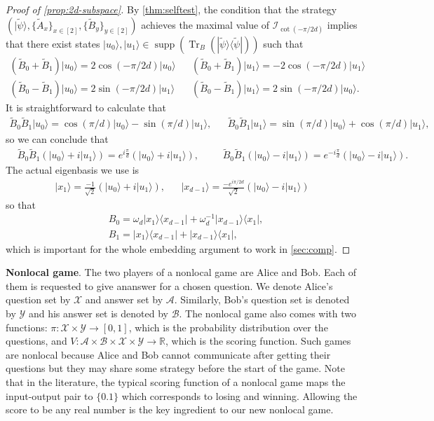 \documentclass[11pt,letterpaper]{article}
\newcommand{\ket}[1]{|#1\rangle}
\newcommand{\ketbra}[2]{|#1\rangle\langle#2|}
\DeclareMathOperator{\Tr}{Tr}
\DeclareMathOperator{\supp}{supp}
\newcommand{\R}{\mathbb{R}}
\newcommand{\calX}{\mathcal{X}}
\newcommand{\calY}{\mathcal{Y}}
\newcommand{\calA}{\mathcal{A}}
\newcommand{\calB}{\mathcal{B}}
\newcommand{\1}{\mathbb{1}}
\newcommand{\tpsi}{\tilde{\psi}}
\newcommand{\I}{\mathcal{I}}
\theoremstyle{definition}
\begin{document}
\begin{proof}[Proof of \cref{prop:2d-subspace}]
	By \cref{thm:selftest}, the condition that the strategy $(\ket{\tpsi}, \{\tilde{A}_x\}_{x \in [2]}, \{\tilde{B}_y\}_{y \in [2]})$ achieves the  
	maximal value of $\I_{\cot(-\pi/2d)} $ implies that there exist states $\ket{u_0}, \ket{u_1} \in \supp(\Tr_B(\ketbra{\tpsi}{\tpsi}))$ such that 
	\begin{align*}
	(\tilde{B}_0 + \tilde{B}_1) \ket{u_0} = 2\cos(-\pi/2d) \ket{u_0} 
	&&(\tilde{B}_0 + \tilde{B}_1) \ket{u_1} = -2\cos(-\pi/2d) \ket{u_1}\\
	(\tilde{B}_0 - \tilde{B}_1) \ket{u_0} = 2\sin(-\pi/2d) \ket{u_1} 
	&&(\tilde{B}_0 - \tilde{B}_1) \ket{u_1} = 2\sin(-\pi/2d) \ket{u_0}.
	\end{align*}
	It is straightforward to calculate that 
	\begin{align*}
		\tilde{B}_0\tilde{B}_1 \ket{u_0} = \cos(\pi/d) \ket{u_0} -\sin(\pi/d) \ket{u_1},&&
		\tilde{B}_0\tilde{B}_1\ket{u_1} = \sin(\pi/d)\ket{u_0} + \cos(\pi/d) \ket{u_1},
	\end{align*}
	so we can conclude that 
	\begin{align*}
		&\tilde{B}_0\tilde{B}_1(\ket{u_0} + i\ket{u_1}) = e^{i \frac{\pi}{d}} (\ket{u_0} + i\ket{u_1}), &&
		&\tilde{B}_0\tilde{B}_1(\ket{u_0} - i\ket{u_1}) = e^{-i \frac{\pi}{d}} (\ket{u_0} - i\ket{u_1}).
	\end{align*}
	The actual eigenbasis we use is 
	\begin{align}
		\ket{x_1} = \frac{-1}{\sqrt{2}}(\ket{u_0} + i\ket{u_1}), &&
		\ket{x_{d-1}} = \frac{-e^{i\pi/2d}}{\sqrt{2}}(\ket{u_0} - i\ket{u_1})
	\end{align}
	so that 
	\begin{align}
		&B_0 = \omega_d\ketbra{x_1}{x_{d-1}} + \omega_d^{-1} \ketbra{x_{d-1}}{x_1},\\
		&B_1 =\ketbra{x_1}{x_{d-1}}  + \ketbra{x_{d-1}}{x_1},
	\end{align}
	which is important for the whole embedding argument to work in \cref{sec:comp}.
\end{proof}

\textbf{Nonlocal game}. The two players of a nonlocal game are Alice and Bob. Each of them is requested
to give ananswer for a chosen question. We denote Alice's question set by $\calX$ and answer set by $\calA$. Similarly,
Bob's question set is denoted by $\calY$ and his answer set is denoted by $\calB$. The nonlocal game also
comes with two functions: $\pi: \calX \times \calY \rightarrow [0,1]$, which is the probability distribution over the questions,
and $V: \calA \times \calB \times \calX \times \calY \rightarrow \R$, which is the scoring function. Such games are nonlocal
because Alice and Bob cannot communicate after getting their questions but they may share some strategy before 
the start of the game. Note that in the literature, the typical scoring function of a nonlocal game maps the input-output
pair to $\{0.1\}$ which corresponds to losing and winning. Allowing the score to be any real number is the key ingredient 
to our new nonlocal game. 
\end{document}
